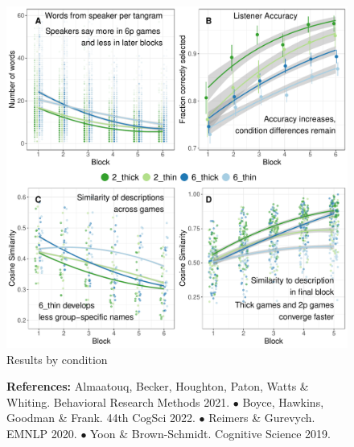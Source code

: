 \documentclass[11pt,a4paper]{article}
\begin{document}
\begin{figure}
	\includegraphics[width=\textwidth]{../images/CAMP1.pdf}
	\caption{Results by condition}
\end{figure}

\begin{figure}\textbf{References:}  Almaatouq, Becker, Houghton, Paton, Watts \& Whiting. Behavioral Research Methods 2021. 
$\bullet$ Boyce, Hawkins, Goodman \& Frank. 44th CogSci 2022. $\bullet$ Reimers \& Gurevych. EMNLP 2020. 
$\bullet$ Yoon \& Brown-Schmidt. Cognitive Science 2019.
  \end{figure}
\end{document}
